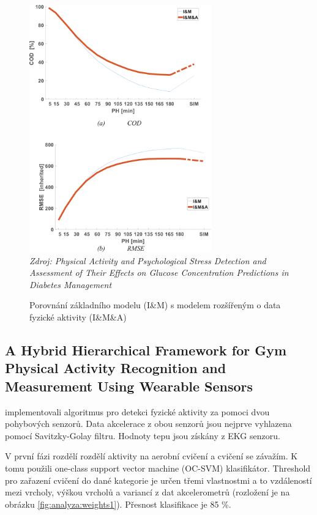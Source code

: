 \begin{figure}[H]
\caption{Porovnání základního modelu (I\&M) s modelem rozšířeným o data fyzické aktivity (I\&M\&A)}
\label{fig:analyza:blackbox}
\centering
\includegraphics[width=0.7\textwidth]{img/analyzaPA/blackbox.png}\\
\textit{Zdroj: Physical Activity and Psychological Stress Detection and Assessment of Their Effects on Glucose Concentration Predictions in Diabetes Management \citep{analyzaPA.SU}}
\end{figure}


\subsection{A Hybrid Hierarchical Framework for Gym Physical Activity Recognition and Measurement Using Wearable Sensors}
\label{ch:analyza:Weights}

\citet{analyzaPA.Weights} implementovali algoritmus pro detekci fyzické aktivity za pomoci dvou pohybových senzorů. Data akcelerace z obou senzorů jsou nejprve vyhlazena pomocí Savitzky-Golay filtru. Hodnoty tepu jsou získány z EKG senzoru.

V první fázi rozdělí rozdělí aktivity na aerobní cvičení a cvičení se závažím. K tomu použili one-class support vector machine (OC-SVM) klasifikátor. Threshold pro zařazení cvičení do dané kategorie je určen třemi vlastnostmi a to vzdáleností mezi vrcholy, výškou vrcholů a variancí z dat akcelerometrů (rozložení je na obrázku \ref{fig:analyza:weights1}). Přesnost klasifikace je 85 \%.

